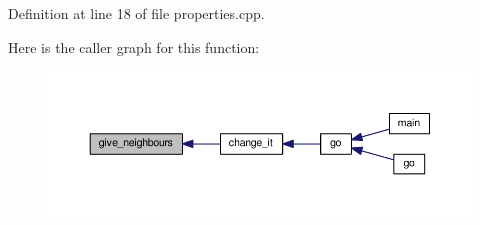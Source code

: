 Definition at line 18 of file properties.\+cpp.



Here is the caller graph for this function\+:
\nopagebreak
\begin{figure}[H]
\begin{center}
\leavevmode
\includegraphics[width=350pt]{_parametric_2_starling-_simulation_2src_2properties_8cpp_a8a274a3ed40ef9c3fb2eea8f2f2f8358_icgraph}
\end{center}
\end{figure}


